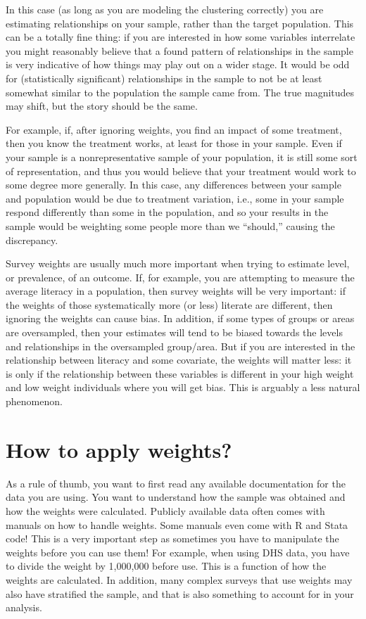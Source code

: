 \documentclass[
  letterpaper,
  DIV=11,
  numbers=noendperiod]{scrreprt}
\begin{document}
In this case (as long as you are modeling the clustering correctly) you
are estimating relationships on your sample, rather than the target
population. This can be a totally fine thing: if you are interested in
how some variables interrelate you might reasonably believe that a found
pattern of relationships in the sample is very indicative of how things
may play out on a wider stage. It would be odd for (statistically
significant) relationships in the sample to not be at least somewhat
similar to the population the sample came from. The true magnitudes may
shift, but the story should be the same.

For example, if, after ignoring weights, you find an impact of some
treatment, then you know the treatment works, at least for those in your
sample. Even if your sample is a nonrepresentative sample of your
population, it is still some sort of representation, and thus you would
believe that your treatment would work to some degree more generally. In
this case, any differences between your sample and population would be
due to treatment variation, i.e., some in your sample respond
differently than some in the population, and so your results in the
sample would be weighting some people more than we ``should,'' causing
the discrepancy.

Survey weights are usually much more important when trying to estimate
level, or prevalence, of an outcome. If, for example, you are attempting
to measure the average literacy in a population, then survey weights
will be very important: if the weights of those systematically more (or
less) literate are different, then ignoring the weights can cause bias.
In addition, if some types of groups or areas are oversampled, then your
estimates will tend to be biased towards the levels and relationships in
the oversampled group/area. But if you are interested in the
relationship between literacy and some covariate, the weights will
matter less: it is only if the relationship between these variables is
different in your high weight and low weight individuals where you will
get bias. This is arguably a less natural phenomenon.

\hypertarget{how-to-apply-weights}{%
\section{How to apply weights?}\label{how-to-apply-weights}}

As a rule of thumb, you want to first read any available documentation
for the data you are using. You want to understand how the sample was
obtained and how the weights were calculated. Publicly available data
often comes with manuals on how to handle weights. Some manuals even
come with R and Stata code! This is a very important step as sometimes
you have to manipulate the weights before you can use them! For example,
when using DHS data, you have to divide the weight by 1,000,000 before
use. This is a function of how the weights are calculated. In addition,
many complex surveys that use weights may also have stratified the
sample, and that is also something to account for in your analysis.
\end{document}

